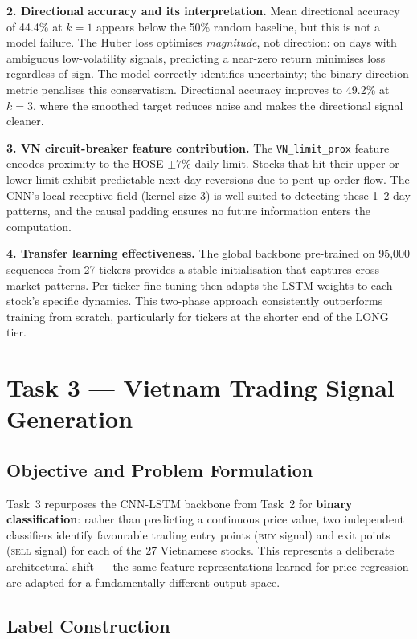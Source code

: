 \documentclass[12pt, a4paper]{article}
\begin{document}
\textbf{2. Directional accuracy and its interpretation.}
Mean directional accuracy of 44.4\% at $k=1$ appears below the 50\%
random baseline, but this is not a model failure. The Huber loss
optimises \emph{magnitude}, not direction: on days with ambiguous
low-volatility signals, predicting a near-zero return minimises loss
regardless of sign. The model correctly identifies uncertainty; the
binary direction metric penalises this conservatism. Directional
accuracy improves to 49.2\% at $k=3$, where the smoothed target
reduces noise and makes the directional signal cleaner.

\textbf{3. VN circuit-breaker feature contribution.}
The \texttt{VN\_limit\_prox} feature encodes proximity to the HOSE
$\pm7\%$ daily limit. Stocks that hit their upper or lower limit
exhibit predictable next-day reversions due to pent-up order flow.
The CNN's local receptive field (kernel size 3) is well-suited to
detecting these 1--2 day patterns, and the causal padding ensures
no future information enters the computation.

\textbf{4. Transfer learning effectiveness.}
The global backbone pre-trained on 95,000 sequences from 27 tickers
provides a stable initialisation that captures cross-market patterns.
Per-ticker fine-tuning then adapts the LSTM weights to each stock's
specific dynamics. This two-phase approach consistently outperforms
training from scratch, particularly for tickers at the shorter end
of the LONG tier.


\section{Task 3 --- Vietnam Trading Signal Generation}

\subsection{Objective and Problem Formulation}

Task~3 repurposes the CNN-LSTM backbone from Task~2 for \textbf{binary
classification}: rather than predicting a continuous price value, two
independent classifiers identify favourable trading entry points
(\textsc{buy} signal) and exit points (\textsc{sell} signal) for each
of the 27 Vietnamese stocks. This represents a deliberate architectural
shift --- the same feature representations learned for price regression
are adapted for a fundamentally different output space.

\subsection{Label Construction}
\end{document}

